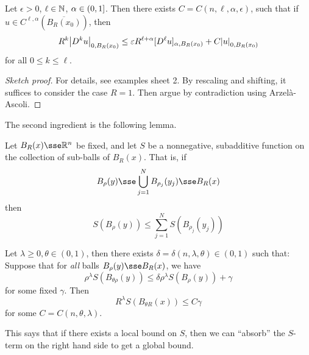 \documentclass{article}
\begin{document}
\begin{theorem}
     Let \(\epsilon > 0\), \(\ell \in \mathbb{N}\), \(\alpha \in (0, 1]\). Then there exists \(C =  C(n, \ell, \alpha, \epsilon)\), such that if \(u \in C^{\ell, \alpha}(\overline{B_R(x_0)})\), then
    \[R^k\abs{D^k u}_{0, B_R(x_0)} \le \varepsilon R^{\ell + \alpha}[D^\ell u]_{\alpha, B_R(x_0)} + C\abs{u}_{0, B_R(x_0)}\]
    for all \(0 \le k \le \ell\).
\end{theorem}

\begin{proof}
    [Sketch proof] For details, see examples sheet 2. By rescaling and shifting, it suffices to consider the case \(R = 1\). Then argue by contradiction using Arzel\`a-Ascoli.
\end{proof}

The second ingredient is the following lemma.

\begin{theorem}
     Let \(B_R(x) \sse \R^n\) be fixed, and let \(S\) be a nonnegative, subadditive function on the collection of sub-balls of \(B_R(x)\). That is, if
    \[B_\rho(y) \sse \bigcup_{j=1}^N B_{\rho_j}(y_j) \sse B_R(x)\]
    then
    \[S(B_\rho(y)) \le \sum_{j=1}^N S(B_{\rho_j}(y_j))\]

    Let \(\lambda \ge 0, \theta \in (0, 1)\), then there exists \(\delta = \delta(n, \lambda, \theta) \in (0, 1)\) such that: Suppose that for \emph{all} balls \(B_\rho(y) \sse B_R(x)\), we have
    \[\rho^\lambda S(B_{\theta\rho}(y)) \le \delta\rho^\lambda S(B_\rho(y)) + \gamma\]
    for some fixed \(\gamma\). Then
    \[R^\lambda S(B_{\theta R}(x)) \le C\gamma\]
    for some \(C = C(n, \theta, \lambda)\).
\end{theorem}

\begin{remark}
    This says that if there exists a local bound on \(S\), then we can ``absorb'' the \(S\)-term on the right hand side to get a global bound.
\end{remark}

\lec
\end{document}
